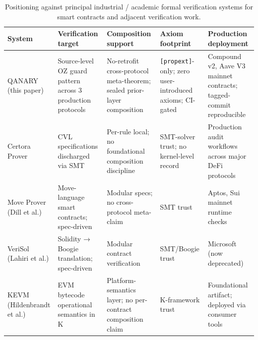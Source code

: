 \begin{table}[!t]\footnotesize\centering
\caption{Positioning against principal industrial / academic formal
verification systems for smart contracts and adjacent verification
work.}
\begin{tabular}{@{} >{\raggedright\arraybackslash}p{} >{\raggedright\arraybackslash}p{} >{\raggedright\arraybackslash}p{} >{\raggedright\arraybackslash}p{} >{\raggedright\arraybackslash}p{}@{}}
\toprule
\begin{minipage}[b]{\linewidth}\raggedright
System
\end{minipage} & \begin{minipage}[b]{\linewidth}\raggedright
Verification target
\end{minipage} & \begin{minipage}[b]{\linewidth}\raggedright
Composition support
\end{minipage} & \begin{minipage}[b]{\linewidth}\raggedright
Axiom footprint
\end{minipage} & \begin{minipage}[b]{\linewidth}\raggedright
Production deployment
\end{minipage} \\
\midrule
\bottomrule
QANARY (this paper) & Source-level OZ guard pattern across 3 production
protocols & No-retrofit cross-protocol meta-theorem; sealed prior-layer
composition & \texttt{{[}propext{]}}-only; zero user-introduced axioms;
CI-gated & Compound v2, Aave V3 mainnet contracts; tagged-commit
reproducible \\
Certora Prover & CVL specifications discharged via SMT & Per-rule local;
no foundational composition discipline & SMT-solver trust; no
kernel-level record & Production audit workflows across major DeFi
protocols \\
Move Prover (Dill et al.) & Move-language smart contracts; spec-driven &
Modular specs; no cross-protocol meta-claim & SMT trust & Aptos, Sui
mainnet runtime checks \\
VeriSol (Lahiri et al.) & Solidity → Boogie translation; spec-driven &
Modular contract verification & SMT/Boogie trust & Microsoft (now
deprecated) \\
KEVM (Hildenbrandt et al.) & EVM bytecode operational semantics in K &
Platform-semantics layer; no per-contract composition claim &
K-framework trust & Foundational artifact; deployed via consumer
tools \\
\end{tabular}
\end{table}

